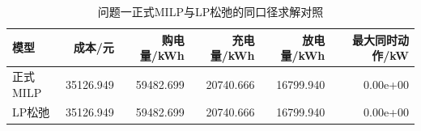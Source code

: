 \begin{table}[H]
  \centering
  \caption{问题一正式MILP与LP松弛的同口径求解对照}
  \label{tab:p1-lp-relaxation}
  \small
  \begin{tabular}{lrrrrr}
    \toprule
    模型 & 成本/元 & 购电量/kWh & 充电量/kWh & 放电量/kWh & 最大同时动作/kW \\
    \midrule
    正式MILP & 35126.949 & 59482.699 & 20740.666 & 16799.940 & 0.00e+00 \\
    LP松弛 & 35126.949 & 59482.699 & 20740.666 & 16799.940 & 0.00e+00 \\
    \bottomrule
  \end{tabular}
\end{table}
